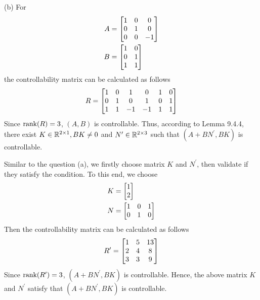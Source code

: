 (b) For
\begin{align}
    A &= \begin{bmatrix} 1 &0 &0 \\ 0 &1 &0 \\ 0 &0 &-1 \end{bmatrix} \\
    B &= \begin{bmatrix} 1 &0 \\ 0 &1 \\ 1 &1 \end{bmatrix}
\end{align}
the controllability matrix can be calculated as follows
\begin{equation}
    R = \begin{bmatrix}
    1     &0     &1     &0     &1     &0 \\ 
    0     &1     &0     &1     &0     &1 \\
    1     &1    &-1    &-1     &1     &1
    \end{bmatrix}
\end{equation}
Since $\textnormal{rank}(R) = 3$, $(A,B)$ is controllable. Thus, according to Lemma 9.4.4, there exist $K\in\mathbb{R}^{2\times 1},BK\neq 0$ and $N^\prime\in\mathbb{R}^{2\times 3}$ such that $(A+BN^\prime,BK)$ is controllable. 

Similar to the question (a), we firstly choose matrix $K$ and $N^\prime$, then validate if they satisfy the condition. To this end, we choose
\begin{align}
    K &= \begin{bmatrix} 1 \\ 2 \end{bmatrix} \\
    N &= \begin{bmatrix} 1 &0 &1 \\ 0 &1 &0 \end{bmatrix} 
\end{align}
Then the controllability matrix can be calculated as follows
\begin{equation}
    R^\prime = \begin{bmatrix} 
    1     &5    &13 \\ 
    2     &4     &8 \\ 
    3     &3     &9 \\ 
    \end{bmatrix}
\end{equation}
Since $\textnormal{rank}(R^\prime) = 3$, $(A+BN^\prime,BK)$ is controllable. Hence, the above matrix $K$ and $N^\prime$ satisfy that $(A+BN^\prime,BK)$ is controllable.


